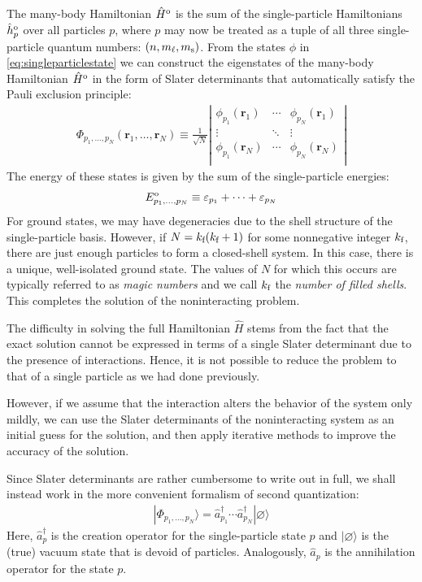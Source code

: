 \documentclass[amsmath, amssymb, aps, floatfix, nofootinbib, preprintnumbers,showpacs, superscriptaddress, twocolumn]{revtex4-1}
\begin{document}
The many-body Hamiltonian $\hat H^{\text o}$ is the sum of the single-particle
Hamiltonians $\hat h^{\text o}_p$ over all particles $p$, where $p$ may now be
treated as a tuple of all three single-particle quantum numbers:
$(n, m_\ell, m_{\text s})$.  From the states $\phi$ in
\eqref{eq:singleparticlestate} we can construct the eigenstates of the
many-body Hamiltonian $\hat H^{\text o}$ in the form of Slater determinants
that automatically satisfy the Pauli exclusion principle:
\begin{align*}
  \Phi_{p_1, \ldots, p_N}(\bm r_1, \ldots, \bm r_N) \equiv
  \frac{1}{\sqrt{N}} \left|
  \begin{matrix}
    \phi_{p_1}(\bm r_1) & \cdots & \phi_{p_N}(\bm r_1) \\
    \vdots & \ddots & \vdots \\
    \phi_{p_1}(\bm r_N) & \cdots & \phi_{p_N}(\bm r_N) \\
  \end{matrix}
  \right|
\end{align*}
The energy of these states is given by the sum of the single-particle
energies:
\begin{align*}
  E^{\text o}_{p_1, \ldots, p_N} \equiv
  \varepsilon_{p_1} + \cdots + \varepsilon_{p_N}
\end{align*}
For ground states, we may have degeneracies due to the shell structure of the
single-particle basis.  However, if $N = k_{\text f} (k_{\text f} + 1)$ for
some nonnegative integer $k_{\text f}$, there are just enough particles to
form a closed-shell system.  In this case, there is a unique, well-isolated
ground state.  The values of $N$ for which this occurs are typically referred
to as \textit{magic numbers} and we call $k_{\text f}$ the \textit{number of
  filled shells}.  This completes the solution of the noninteracting problem.

The difficulty in solving the full Hamiltonian $\hat H$ stems from the fact
that the exact solution cannot be expressed in terms of a single Slater
determinant due to the presence of interactions.  Hence, it is not possible to
reduce the problem to that of a single particle as we had done previously.

However, if we assume that the interaction alters the behavior of the system
only mildly, we can use the Slater determinants of the noninteracting system
as an initial guess for the solution, and then apply iterative methods to
improve the accuracy of the solution.

Since Slater determinants are rather cumbersome to write out in full, we shall
instead work in the more convenient formalism of second quantization:
\begin{align*}
  |\Phi_{p_1, \ldots, p_N}\rangle =
  \hat a_{p_1}^\dagger \cdots \hat a_{p_N}^\dagger |\varnothing\rangle
\end{align*}
Here, $\hat a_p^\dagger$ is the creation operator for the single-particle
state $p$ and $|\varnothing\rangle$ is the (true) vacuum state that is devoid
of particles.  Analogously, $\hat a_p$ is the annihilation operator for the
state $p$.
\end{document}
